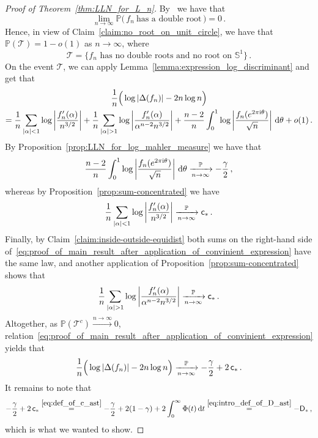 \documentclass[11pt]{amsart}
\theoremstyle{remark}
\theoremstyle{definition}
\newcommand{\bP}{\mathbb P}
\newcommand{\bS}{\mathbb S}
\newcommand{\I}{{\rm i}}
\newcommand{\disc}{\Delta}
\begin{document}
    \begin{proof}[Proof of Theorem~\ref{thm:LLN_for_L_n}]
        By~\cite[Corollary~1.2]{Michelen-Yakir-root-separation} we have that
        \[
        \lim_{n\to \infty} \bP\Big( \, f_n \ \text{has a double root} \, \Big) = 0 \, .
        \]
        Hence, in view of Claim~\ref{claim:no_root_on_unit_circle}, we have that $\bP(\mathcal{T}) = 1 - o(1)$ as $n\to\infty$, where
        \[
        \mathcal{T} = \Big\{ \text{$f_n$ has no double roots and no root on $\bS^1$}\Big\} \, .
        \]
        On the event $\mathcal{T}$, we can apply Lemma~\ref{lemma:expression_log_discriminant} and get that
        \begin{multline}
        \label{eq:proof_of_main_result_after_application_of_convinient_expression}
            \frac{1}{n}\Big(\log|\disc(f_n)| - 2n\log n\Big) \\ = \frac{1}{n}\sum_{|\alpha| < 1} \log \left|\frac{f_n'(\alpha)}{n^{3/2}}\right| + \frac{1}{n}\sum_{|\alpha| > 1} \log \left|\frac{f_n'(\alpha)}{\alpha^{n-2} n^{3/2}}\right| + \frac{n-2}{n} \int_0^1 \log \left|\frac{f_n(e^{2\pi \I \theta})}{\sqrt{n}}\right| \,{\rm d}\theta  + o(1) \, .
        \end{multline}
        By Proposition~\ref{prop:LLN_for_log_mahler_measure} we have that
        \[
        \frac{n-2}{n} \int_0^1 \log \left|\frac{f_n(e^{2\pi \I \theta})}{\sqrt{n}}\right| \,{\rm d}\theta \xrightarrow[n\to\infty]{\bP} -\frac{\gamma}{2}\, , 
        \]
        whereas by Proposition~\ref{prop:sum-concentrated} we have
        \[
        \frac{1}{n}\sum_{|\alpha| < 1} \log \left|\frac{f_n'(\alpha)}{n^{3/2}}\right| \xrightarrow[n\to\infty]{\bP} {\sf c}_\ast \, .
        \]
        Finally, by Claim~\ref{claim:inside-outside-equidist} both sums on the right-hand side of~\eqref{eq:proof_of_main_result_after_application_of_convinient_expression} have the same law, and another application of Proposition~\ref{prop:sum-concentrated} shows that 
        \[
        \frac{1}{n}\sum_{|\alpha| > 1} \log \left|\frac{f_n'(\alpha)}{\alpha^{n-2} n^{3/2}}\right| \xrightarrow[n\to\infty]{\bP} {\sf c}_\ast \, .
        \]
        Altogether, as $\bP(\mathcal{T}^c) \xrightarrow{n\to \infty} 0$, relation~\eqref{eq:proof_of_main_result_after_application_of_convinient_expression} yields that
        \[
        \frac{1}{n}\Big(\log|\disc(f_n)| - 2n\log n\Big) \xrightarrow[n\to \infty]{\bP} -\frac{\gamma}{2}+2 \, {\sf c}_\ast \, . 
        \]
        It remains to note that
        \[-\frac{\gamma}{2}+2 \, {\sf c}_\ast \stackrel{\eqref{eq:def_of_c_ast}}{=} -\frac{\gamma}{2} + 2(1-\gamma)+2\int_0^\infty \Phi(t) \, {\rm d}t \stackrel{\eqref{eq:intro_def_of_D_ast}}{=} - {\sf D}_\ast \, ,
        \]
        which is what we wanted to show. 
    \end{proof}
\end{document}
